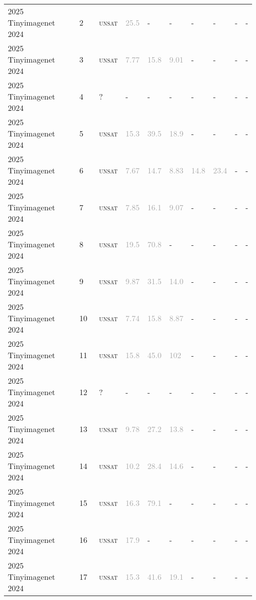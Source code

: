 \begin{center}
{\begin{longtable}{@{}llllllllll@{}}
2025 Tinyimagenet 2024 & 2 & ~\textsc{unsat} & \textcolor{darkgray}{25.5} & - & - & - & - & - & - \\
2025 Tinyimagenet 2024 & 3 & ~\textsc{unsat} & \textcolor{darkgray}{7.77} & \textcolor{darkgray}{15.8} & \textcolor{darkgray}{9.01} & - & - & - & - \\
2025 Tinyimagenet 2024 & 4 & ~? & - & - & - & - & - & - & - \\
2025 Tinyimagenet 2024 & 5 & ~\textsc{unsat} & \textcolor{darkgray}{15.3} & \textcolor{darkgray}{39.5} & \textcolor{darkgray}{18.9} & - & - & - & - \\
2025 Tinyimagenet 2024 & 6 & ~\textsc{unsat} & \textcolor{darkgray}{7.67} & \textcolor{darkgray}{14.7} & \textcolor{darkgray}{8.83} & \textcolor{darkgray}{14.8} & \textcolor{darkgray}{23.4} & - & - \\
2025 Tinyimagenet 2024 & 7 & ~\textsc{unsat} & \textcolor{darkgray}{7.85} & \textcolor{darkgray}{16.1} & \textcolor{darkgray}{9.07} & - & - & - & - \\
2025 Tinyimagenet 2024 & 8 & ~\textsc{unsat} & \textcolor{darkgray}{19.5} & \textcolor{darkgray}{70.8} & - & - & - & - & - \\
2025 Tinyimagenet 2024 & 9 & ~\textsc{unsat} & \textcolor{darkgray}{9.87} & \textcolor{darkgray}{31.5} & \textcolor{darkgray}{14.0} & - & - & - & - \\
2025 Tinyimagenet 2024 & 10 & ~\textsc{unsat} & \textcolor{darkgray}{7.74} & \textcolor{darkgray}{15.8} & \textcolor{darkgray}{8.87} & - & - & - & - \\
2025 Tinyimagenet 2024 & 11 & ~\textsc{unsat} & \textcolor{darkgray}{15.8} & \textcolor{darkgray}{45.0} & \textcolor{darkgray}{102} & - & - & - & - \\
2025 Tinyimagenet 2024 & 12 & ~? & - & - & - & - & - & - & - \\
2025 Tinyimagenet 2024 & 13 & ~\textsc{unsat} & \textcolor{darkgray}{9.78} & \textcolor{darkgray}{27.2} & \textcolor{darkgray}{13.8} & - & - & - & - \\
2025 Tinyimagenet 2024 & 14 & ~\textsc{unsat} & \textcolor{darkgray}{10.2} & \textcolor{darkgray}{28.4} & \textcolor{darkgray}{14.6} & - & - & - & - \\
2025 Tinyimagenet 2024 & 15 & ~\textsc{unsat} & \textcolor{darkgray}{16.3} & \textcolor{darkgray}{79.1} & - & - & - & - & - \\
2025 Tinyimagenet 2024 & 16 & ~\textsc{unsat} & \textcolor{darkgray}{17.9} & - & - & - & - & - & - \\
2025 Tinyimagenet 2024 & 17 & ~\textsc{unsat} & \textcolor{darkgray}{15.3} & \textcolor{darkgray}{41.6} & \textcolor{darkgray}{19.1} & - & - & - & - \\

\end{longtable}}
\end{center}
